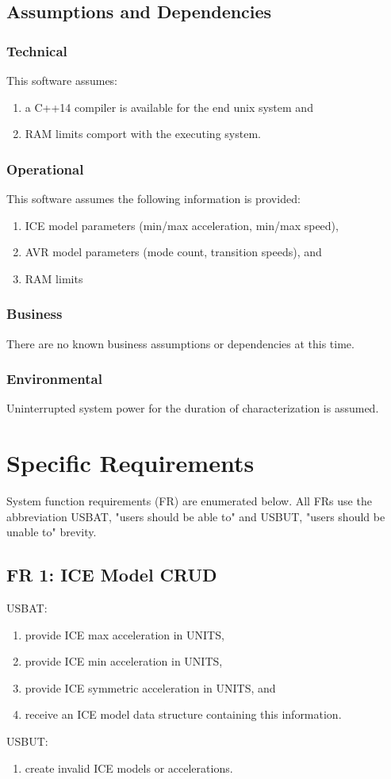 \documentclass[12pt,a4paper]{article}
\begin{document}
\subsection{Assumptions and Dependencies}
\subsubsection{Technical}
This software assumes:
\begin{enumerate}
    \item a C++14 compiler is available for the end unix system and
    \item RAM limits comport with the executing system.
\end{enumerate}
\subsubsection{Operational}
This software assumes the following information is provided:
\begin{enumerate}
    \item ICE model parameters (min/max acceleration, min/max speed),
    \item AVR model parameters (mode count, transition speeds), and
    \item RAM limits
\end{enumerate}
\subsubsection{Business}
There are no known business assumptions or dependencies at this time.
\subsubsection{Environmental}
Uninterrupted system power for the duration of characterization is assumed.

\section{Specific Requirements}
System function requirements (FR) are enumerated below.
All FRs use the abbreviation USBAT, "users should be able to" and 
USBUT, "users should be unable to" brevity.
\subsection{FR 1: ICE Model CRUD}
USBAT:
\begin{enumerate}
    \item provide ICE max acceleration in UNITS,
    \item provide ICE min acceleration in UNITS,
    \item provide ICE symmetric acceleration in UNITS, and
    \item receive an ICE model data structure containing this information.
\end{enumerate}
USBUT:
\begin{enumerate}
    \item create invalid ICE models or accelerations.
\end{enumerate}
\end{document}
